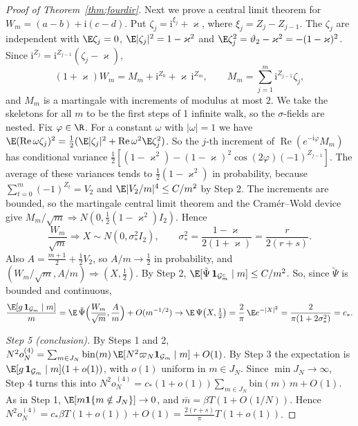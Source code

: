 \begin{proof}[Proof of Theorem~\ref{thm:fourdir}]
Next we prove a central limit theorem for $W_m=(a-b)+\mathrm i(c-d)$. Put
$\zeta_j=\mathrm i^{\xi_j}+\varkappa$, where $\xi_j=Z_j-Z_{j-1}$. The $\zeta_j$ are independent with
$\E\zeta_j=0$, $\E\lvert\zeta_j\rvert^2=1-\varkappa^2$ and
$\E\zeta_j^2=\vartheta_2-\varkappa^2=-(1-\varkappa)^2$. Since
$\mathrm i^{Z_j}=\mathrm i^{Z_{j-1}}(\zeta_j-\varkappa)$,
\[
 (1+\varkappa)W_m=M_m+\mathrm i^{Z_0}+\varkappa\,\mathrm i^{Z_m},\qquad
 M_m=\sum_{j=1}^m\mathrm i^{Z_{j-1}}\zeta_j,
\]
and $M_m$ is a martingale with increments of modulus at most $2$. We take the skeletons for all $m$
to be the first steps of 1 infinite walk, so the $\sigma$-fields are nested. Fix $\varphi\in\R$. For a
constant $\omega$ with $\lvert\omega\rvert=1$ we have
$\E(\operatorname{Re}\omega\zeta_j)^2=\frac12(\E\lvert\zeta_j\rvert^2+\operatorname{Re}\omega^2\E\zeta_j^2)$.
So the $j$-th increment of $\operatorname{Re}(e^{-\mathrm i\varphi}M_m)$ has conditional variance
$\frac12[(1-\varkappa^2)-(1-\varkappa)^2\cos(2\varphi)(-1)^{Z_{j-1}}]$. The average of these
variances tends to $\frac12(1-\varkappa^2)$ in probability, because
$\sum_{t=0}^m(-1)^{Z_t}=V_2$ and $\E\lvert V_2/m\rvert^4\le C/m^2$ by Step 2. The increments are
bounded, so the martingale central limit theorem \cite[Cor.~3.1]{hallheyde1980} and the
Cram\'er--Wold device give $M_m/\sqrt m\Rightarrow N(0,\frac12(1-\varkappa^2)I_2)$. Hence
\[
 \frac{W_m}{\sqrt m}\Rightarrow X\sim N(0,\sigma_*^2I_2),\qquad
 \sigma_*^2=\frac{1-\varkappa}{2(1+\varkappa)}=\frac r{2(r+s)}.
\]
Also $A=\frac{m+1}2+\frac12V_2$, so $A/m\to\frac12$ in probability, and
$(W_m/\sqrt m,A/m)\Rightarrow(X,\frac12)$. By Step 2,
$\E[\tilde\Psi\,\mathbf 1_{\mathcal G_m^c}\mid m]\le C/m^2$. So, since $\tilde\Psi$ is bounded and
continuous,
\[
 \frac{\E[g\,\mathbf 1_{\mathcal G_m}\mid m]}m
 =\E\,\tilde\Psi\Bigl(\frac{W_m}{\sqrt m},\frac Am\Bigr)+O(m^{-1/2})
 \to\E\,\Psi\bigl(X,\tfrac12\bigr)=\frac2\pi\,\E e^{-\lvert X\rvert^2}
 =\frac2{\pi(1+2\sigma_*^2)}=c_*.
\]

\emph{Step 5 (conclusion).} By Steps 1 and 2,
$N^2o^{(4)}_N=\sum_{m\in J_N}\mathrm{bin}(m)\,\E[N^2\varpi_N\mathbf 1_{\mathcal G_m}\mid m]+O(1)$.
By Step 3 the expectation is $\E[g\,\mathbf 1_{\mathcal G_m}\mid m](1+o(1))$, with $o(1)$ uniform in
$m\in J_N$. Since $\min J_N\to\infty$, Step 4 turns this into
$N^2o^{(4)}_N=c_*(1+o(1))\sum_{m\in J_N}\mathrm{bin}(m)\,m+O(1)$. As in Step 1,
$\E[m\mathbf 1\{m\notin J_N\}]\to0$, and $\bar m=\beta T(1+O(1/N))$. Hence
$N^2o^{(4)}_N=c_*\beta T(1+o(1))+O(1)=\frac{2(r+s)}\pi T(1+o(1))$.
\end{proof}

